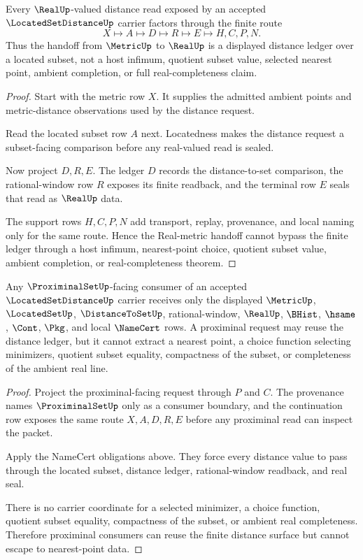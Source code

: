 \begin{theorem}
\label{thm:located-set-distance-real-metric-handoff}
Every $\RealUp$-valued distance read exposed by an accepted $\LocatedSetDistanceUp$ carrier factors through the finite route
$$
X\longmapsto A\longmapsto D\longmapsto R\longmapsto E\longmapsto H,C,P,N .
$$
Thus the handoff from $\MetricUp$ to $\RealUp$ is a displayed distance ledger over a located subset, not a host infimum, quotient subset value, selected nearest point, ambient completion, or full real-completeness claim.
\end{theorem}
\begin{proof}
Start with the metric row $X$. It supplies the admitted ambient points and metric-distance observations used by the distance request.

Read the located subset row $A$ next. Locatedness makes the distance request a subset-facing comparison before any real-valued read is sealed.

Now project $D,R,E$. The ledger $D$ records the distance-to-set comparison, the rational-window row $R$ exposes its finite readback, and the terminal row $E$ seals that read as $\RealUp$ data.

The support rows $H,C,P,N$ add transport, replay, provenance, and local naming only for the same route. Hence the Real-metric handoff cannot bypass the finite ledger through a host infimum, nearest-point choice, quotient subset value, ambient completion, or real-completeness theorem.
\end{proof}

\begin{theorem}
\label{thm:located-set-distance-proximinal-nonescape}
Any $\ProximinalSetUp$-facing consumer of an accepted $\LocatedSetDistanceUp$ carrier receives only the displayed $\MetricUp$, $\LocatedSetUp$, $\DistanceToSetUp$, rational-window, $\RealUp$, $\BHist$, $\hsame$, $\Cont$, $\Pkg$, and local $\NameCert$ rows. A proximinal request may reuse the distance ledger, but it cannot extract a nearest point, a choice function selecting minimizers, quotient subset equality, compactness of the subset, or completeness of the ambient real line.
\end{theorem}
\begin{proof}
Project the proximinal-facing request through $P$ and $C$. The provenance names $\ProximinalSetUp$ only as a consumer boundary, and the continuation row exposes the same route $X,A,D,R,E$ before any proximinal read can inspect the packet.

Apply the NameCert obligations above. They force every distance value to pass through the located subset, distance ledger, rational-window readback, and real seal.

There is no carrier coordinate for a selected minimizer, a choice function, quotient subset equality, compactness of the subset, or ambient real completeness. Therefore proximinal consumers can reuse the finite distance surface but cannot escape to nearest-point data.
\end{proof}

